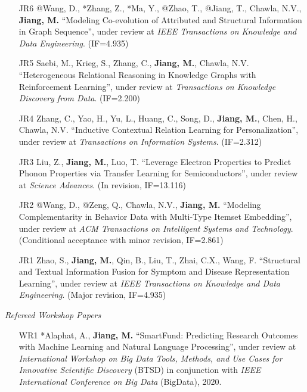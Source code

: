 \documentclass[10pt]{article}
\newenvironment{myindentpar}[1]%
{\begin{list}{}%
         {\setlength{\leftmargin}{#1}}%
         \item[]%
}
{\end{list}}
\newcounter{list}
\begin{document}
\begin{myindentpar}{0.00cm}
\begin{enumerate}[leftmargin=.5cm]

\item[JR6] @Wang, D., *Zhang, Z., *Ma, Y., @Zhao, T., @Jiang, T., Chawla, N.V., \textbf{Jiang, M.} ``Modeling Co-evolution of Attributed and Structural Information in Graph Sequence'', under review at \textit{IEEE Transactions on Knowledge and Data Engineering}. (IF=4.935)

\item[JR5] Saebi, M., Krieg, S., Zhang, C., \textbf{Jiang, M.}, Chawla, N.V. ``Heterogeneous Relational Reasoning in Knowledge Graphs with Reinforcement Learning'', under review at \textit{Transactions on Knowledge Discovery from Data}. (IF=2.200)
	
\item[JR4] Zhang, C., Yao, H., Yu, L., Huang, C., Song, D., \textbf{Jiang, M.}, Chen, H., Chawla, N.V. ``Inductive Contextual Relation Learning for Personalization'', under review at \textit{Transactions on Information Systems}. (IF=2.312)

\item[JR3] Liu, Z., \textbf{Jiang, M.}, Luo, T. ``Leverage Electron Properties to Predict Phonon Properties via Transfer Learning for Semiconductors'', under review at \textit{Science Advances}. (In revision, IF=13.116)
	
\item[JR2] @Wang, D., @Zeng, Q., Chawla, N.V., \textbf{Jiang, M.} ``Modeling Complementarity in Behavior Data with Multi-Type Itemset Embedding'', under review at \textit{ACM Transactions on Intelligent Systems and Technology}. (Conditional acceptance with minor revision, IF=2.861)

\item[JR1] Zhao, S., \textbf{Jiang, M.}, Qin, B., Liu, T., Zhai, C.X., Wang, F. ``Structural and Textual Information Fusion for Symptom and Disease Representation Learning'', under review at \textit{IEEE Transactions on Knowledge and Data Engineering}. (Major revision, IF=4.935)

\end{enumerate}

\vspace{.2cm}\hspace{-0.25cm}\textit{Refereed Workshop Papers}

\begin{enumerate}[leftmargin=.5cm]

\item[WR1] *Alaphat, A., \textbf{Jiang, M.} ``SmartFund: Predicting Research Outcomes with Machine Learning and Natural Language Processing'', under review at \textit{International Workshop on Big Data Tools, Methods, and Use Cases for Innovative Scientific Discovery} (BTSD) in conjunction with \textit{IEEE International Conference on Big Data} (BigData), 2020.

\end{enumerate}

\end{myindentpar}
\end{document}
